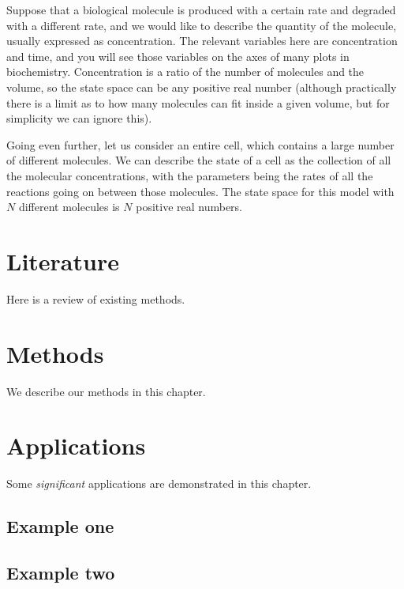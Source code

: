 \documentclass[
]{book}
\begin{document}
Suppose that a biological molecule is produced with a certain rate and degraded with a different rate, and we would like to describe the quantity of the molecule, usually expressed as concentration. The relevant variables here are concentration and time, and you will see those variables on the axes of many plots in biochemistry. Concentration is a ratio of the number of molecules and the volume, so the state space can be any positive real number (although practically there is a limit as to how many molecules can fit inside a given volume, but for simplicity we can ignore this).

Going even further, let us consider an entire cell, which contains a large number of different molecules. We can describe the state of a cell as the collection of all the molecular concentrations, with the parameters being the rates of all the reactions going on between those molecules. The state space for this model with \(N\) different molecules is \(N\) positive real numbers.

\hypertarget{literature}{%
\chapter{Literature}\label{literature}}

Here is a review of existing methods.

\hypertarget{methods}{%
\chapter{Methods}\label{methods}}

We describe our methods in this chapter.

\hypertarget{applications}{%
\chapter{Applications}\label{applications}}

Some \emph{significant} applications are demonstrated in this chapter.

\hypertarget{example-one}{%
\section{Example one}\label{example-one}}

\hypertarget{example-two}{%
\section{Example two}\label{example-two}}
\end{document}
